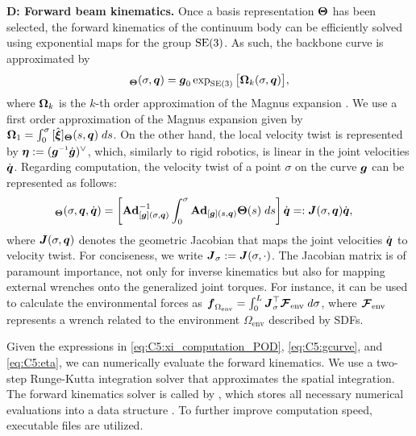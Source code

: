 \textbf{D: Forward beam kinematics.} Once a basis representation ${\boldsymbol{\Theta}}$ has been selected, the forward kinematics of the continuum body can be efficiently solved using exponential maps for the group $\textup{\textrm{SE}}(3)$. As such, the backbone curve is approximated by
%
\begin{equation}
    [\gB]_{\ThetaB}(\sigma,\q) = \gB_0 \exp_{\textrm{SE}(3)} \big[ \OmegaB_k(\sigma,\q)\big],
    \label{eq:C5:gcurve}
\end{equation}
%
where $\boldsymbol{\Omega}_k$ is the $k$-th order approximation of the Magnus expansion \cite{Orekhov2020}. We use a first order approximation of the Magnus expansion given by $\boldsymbol{\Omega}_1 = \int_0^\sigma {[\hat{{\boldsymbol{\xi}}}]_{\boldsymbol{\Theta}}}(s,{\boldsymbol{q}}) \; ds$. On the other hand, the local velocity twist is represented by $\etaB:= (\gB\inv\dot{\gB})^{\vee}$, which, similarly to rigid robotics, is linear in the joint velocities $\dot{{\boldsymbol{q}}}$. Regarding computation, the velocity twist of a point $\sigma$ on the curve ${\boldsymbol{g}}$ can be represented as follows:
%
\begin{align}
    [\etaB]_\ThetaB(\sigma,\q,\dq) & = \left[\Ad^{-1}_{[\gB](\sigma,\q)}\int_{0}^\sigma  \Ad_{[\gB](s,\q)} \ThetaB(s)\; ds \right]  \dq  %
                                   =: \JB(\sigma,\q) \dq,
                                  \label{eq:C5:eta}                                  
\end{align}
%
where ${\boldsymbol{J}}(\sigma,{\boldsymbol{q}})$ denotes the geometric Jacobian that maps the joint velocities ${\dot{\boldsymbol{q}}}$ to velocity twist. For conciseness, we write ${\boldsymbol{J}}_\sigma := {\boldsymbol{J}}(\sigma,\cdot)$. The Jacobian matrix is of paramount importance, not only for inverse kinematics but also for mapping external wrenches onto the generalized joint torques. For instance, it can be used to calculate the environmental forces as ${\boldsymbol{f}}_{\Omega_{\textrm{env}}} = \int_0^L {\boldsymbol{J}}_\sigma^\top {\boldsymbol{\mathcal{F}}}_{\textrm{env}} \; d\sigma$, where ${\boldsymbol{\mathcal{F}}}_{\textrm{env}}$ represents a wrench related to the environment $\Omega_{\textrm{env}}$ described by SDFs. 

Given the expressions in \eqref{eq:C5:xi_computation_POD}, \eqref{eq:C5:gcurve}, and \eqref{eq:C5:eta}, we can numerically evaluate the forward kinematics. We use a two-step Runge-Kutta integration solver that approximates the spatial integration. The forward kinematics solver is called by , which stores all necessary numerical evaluations into a data structure . To further improve computation speed,  executable files are utilized. \\[0.5em]

